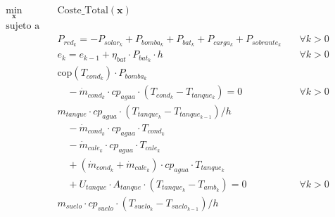 \begin{align}
	\min_{\mathbf{x}} \quad & \text{Coste\_Total}(\mathbf{x}) \label{eq:sand_control_optimization}                                                                           \\
	\text{sujeto a} \quad   & \nonumber                                                                                                                                      \\
	                        & P_{red_k} = -P_{solar_k} + P_{bomba_k} + P_{bat_k} + P_{carga_k} + P_{sobrante_k} \quad                                        & \forall k > 0 \\
	                        & e_k = e_{k-1} + \eta_{bat} \cdot P_{bat_k} \cdot h \quad                                                                       & \forall k > 0 \\
	                        & \text{cop}(T_{cond_k}) \cdot P_{bomba_k} \nonumber                                                                                             \\
	                        & \quad - \dot{m}_{cond_k} \cdot cp_{agua} \cdot (T_{cond_k} - T_{tanque_k}) = 0 \label{eq:sys_1_sand}                           & \forall k > 0 \\
	                        & m_{tanque} \cdot cp_{agua} \cdot ( T_{tanque_k} - T_{tanque_{k-1}}) / h  \nonumber                                                             \\
	                        & \quad - \dot{m}_{cond_k} \cdot cp_{agua} \cdot T_{cond_k} \nonumber                                                                            \\
	                        & \quad - \dot{m}_{cale_k} \cdot cp_{agua} \cdot T_{cale_k} \nonumber                                                                            \\
	                        & \quad + (\dot{m}_{cond_k} + \dot{m}_{cale_k}) \cdot cp_{agua} \cdot T_{tanque_k} \nonumber                                                     \\
	                        & \quad + U_{tanque} \cdot A_{tanque} \cdot (T_{tanque_k} - T_{amb_k}) = 0 \label{eq:sys_2_sand}                                 & \forall k > 0 \\
	                        & m_{suelo} \cdot cp_{suelo} \cdot ( T_{suelo_k} - T_{suelo_{k-1}}) / h \nonumber                                                                \\

\end{align}
